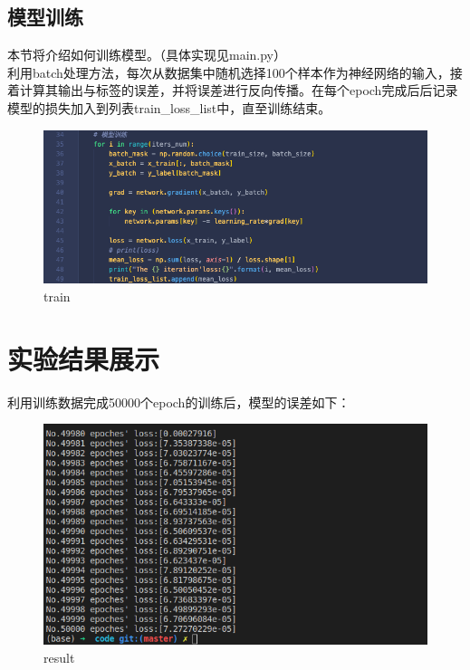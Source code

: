 \documentclass{article}
\begin{document}
\subsection{模型训练}
本节将介绍如何训练模型。（具体实现见main.py）\\
利用batch处理方法，每次从数据集中随机选择100个样本作为神经网络的输入，接着计算其输出与标签的误差，并将误差进行反向传播。在每个epoch完成后后记录模型的损失加入到列表train\_loss\_list中，直至训练结束。
\begin{figure}[H]
	\centering
	\includegraphics[scale=0.6]{train.png}
	\caption{train}
\end{figure}

\section{实验结果展示}
利用训练数据完成50000个epoch的训练后，模型的误差如下：
\begin{figure}[H]
	\centering
	\includegraphics[scale=0.6]{result.png}
	\caption{result}
\end{figure}
\end{document}
